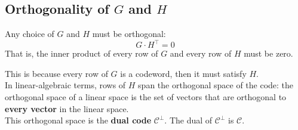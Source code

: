 \documentclass[11pt]{article}
\begin{document}
\subsection{Orthogonality of $G$ and $H$}
Any choice of $G$ and $H$ must be orthogonal:
\[
  G \cdot H^\intercal = 0
\]
That is, the inner product of every row of $G$ and every row of $H$ must be zero.

This is because every row of $G$ is a codeword, then it must satisfy $H$. \\

In linear-algebraic terms, rows of $H$ span the orthogonal space of the code: the orthogonal space of a linear space is the set of vectors that are orthogonal to \textbf{every vector} in the linear space. \\

This orthogonal space is the \textbf{dual code} $\mathcal{C}^\bot$.
The dual of $\mathcal{C}^\bot$ is $\mathcal{C}$.
\end{document}
